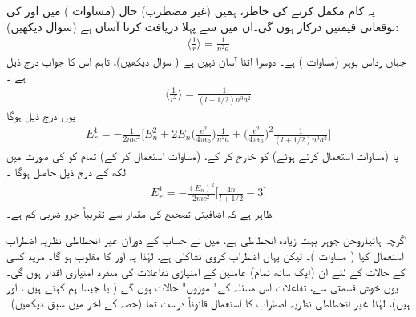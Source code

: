  یہ کام مکمل کرنے کی خاطر،  ہمیں (غیر مضطرب)  حال   (مساوات  )  میں  اور  کی توقعاتی قیمتیں درکار ہوں گی۔ان میں سے   پہلا دریافت کرنا  آسان ہے  (سوال    دیکھیں):
\begin{align}\label{مساوات_غیر_مضطرب_آر_ایک}
\big\langle \frac{1}{r} \big\rangle = \frac{1}{n^2 a}
\end{align}
جہاں  رداس بوہر (مساوات  )  ہے۔  دوسرا اتنا آسان نہیں ہے ( سوال    دیکھیں)،  تاہم اس کا جواب درج ذیل ہے ۔
\begin{align}\label{مساوات_غیر_مضطرب_آر_دوم}
\big\langle \frac{1}{r^2} \big\rangle = \frac{1}{(l + 1/2)n^3 a^2}
\end{align}
یوں درج ذیل ہوگا 
\begin{align*}
E_r^1 = - \frac{1}{2mc^2} \big [ E_n^2 + 2 E_n \big(\frac{e^2}{4 \pi \epsilon_0}\big) \frac{1}{n^2 a} + \big(\frac{e^2}{4 \pi \epsilon_0}\big)^2 \frac{1}{(l + 1/2)n^3 a^2} \big ]
\end{align*}
یا (مساوات    استعمال کرتے ہوئے)   کو خارج  کر کے،   (مساوات  استعمال کر کے)  تمام  کو   کی صورت میں لکھ کے درج ذیل حاصل ہوگا ۔
\begin{align}\label{مساوات_غیر_مضطرب_اضافیتی_تصحیح}
E_r^1 = - \frac{(E_n)^2}{2mc^2} \big [ \frac{4n}{l + 1/2} - 3 \big ]
\end{align}
ظاہر ہے کہ اضافیتی تصحیح کی مقدار  سے تقریباً  جزو ضربی   کم ہے۔

اگرچہ ہائیڈروجن جوہر بہت زیادہ انحطاطی ہے،   میں نے حساب کے دوران غیر انحطاطی نظریہ اضطراب استعمال کیا ( مساوات )۔  لیکن  یہاں  اضطراب کروی تشاکلی ہے،   لہٰذا    یہ  اور  کا مقلوب ہو گا۔  مزید کسی    کے   حالات کے لئے  ان  (ایک ساتھ تمام)   عاملین   کے امتیازی تفاعلات کی  منفرد امتیازی اقدار ہوں گی۔  یوں خوش قسمتی سے،  تفاعلات  اس مسئلہ کے" موزوں"  حالات  ہوں گے (  یا جیسا ہم کہتے ہیں ،  اور   ہیں)،   لہٰذا   غیر انحطاطی نظریہ اضطراب کا استعمال قانوناً   درست تھا  (حصہ  کے آخر میں سبق دیکھیں)۔

